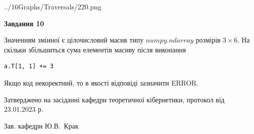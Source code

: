 \documentclass[12pt, ukrainian]{article}
\begin{document}
{\begin {large}
\begin{center}
	{../16Graphs/Traversals/220.png}
\end{center}\par
\newpage

{\begin {center}\textbf{Завдання 10}\end {center}}\par
Значенням змінної  є цілочисловий масив типу $numpy.ndarray$ розмірів $3{\times}6$. На скільки збільшиться сума елементів масиву  після виконання
\begin{verbatim}
a.T[1, 1] += 3
\end{verbatim}


Якщо код некоректний, то в якості відповіді зазначити ERROR.\par
\newpage


\end {large}
}
{\smallskip \begin {small} Затверджено на засіданні кафедри теоретичної кібернетики, протокол  від   23.01.2023 р.\par\smallskip\smallskip
{\parbox {6.5 cm}{Зав. кафедри \dotfill Ю.В.~Крак}} \end{small}}
\end{document}
